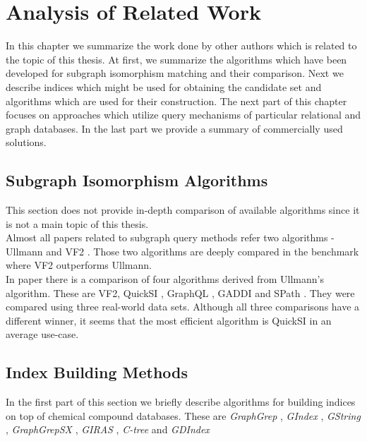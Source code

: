 \chapter{Analysis of Related Work} \label{analysis}

In this chapter we summarize the work done by other authors which is related to the topic of this thesis. At first, we summarize the algorithms which have been developed for subgraph isomorphism matching and their comparison. Next we describe indices which might be used for obtaining the candidate set and algorithms which are used for their construction. The next part of this chapter focuses on approaches which utilize query mechanisms of particular relational and graph databases. In the last part we provide a summary of commercially used solutions.\\

\section{Subgraph Isomorphism Algorithms}

This section does not provide in-depth comparison of available algorithms since it is not a main topic of this thesis.\\

Almost all papers related to subgraph query methods refer two algorithms - Ullmann \cite{Ullmann} and VF2 \cite{VF2}. Those two algorithms are deeply compared in the \cite{Ehrlich2012} benchmark where VF2 outperforms Ullmann.\\

In paper \cite{Lee} there is a comparison of four algorithms derived from Ullmann's algorithm. These are VF2, QuickSI \cite{QuickSI}, GraphQL \cite{GraphQL}, GADDI \cite{GADDI} and SPath \cite{SPath}. They were compared using three real-world data sets. Although all three comparisons have a different winner, it seems that the most efficient algorithm is QuickSI in an average use-case.

\section{Index Building Methods}

In the first part of this section we briefly describe algorithms for building indices on top of chemical compound databases. These are \textit{GraphGrep} \cite{GraphGrep}\cite{GrahGrep:intro}, \textit{GIndex} \cite{GIndex}, \textit{GString} \cite{GString}, \textit{GraphGrepSX} \cite{GraphGrepSX}, \textit{GIRAS} \cite{GIRAS}, \textit{C-tree} \cite{CTree} and \textit{GDIndex} \cite{GDIndex}\\

